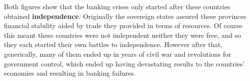 \documentclass{article}
\begin{document}
    Both figures show that the banking crises only started after these countries obtained 
    \textbf{independence}. 
    Originally the sovereign states assured these provinces financial stability aided by 
    trade they provided in terms of resources. Of course this meant these countries were not 
    independent neither they were free, and so they each started their own battles to independence.
    However after that, generically, many of them ended up in years of civil war and 
    revolutions for government control, which ended up having devastating results to the countries' 
    economies and resulting in banking failures.
\end{document}
